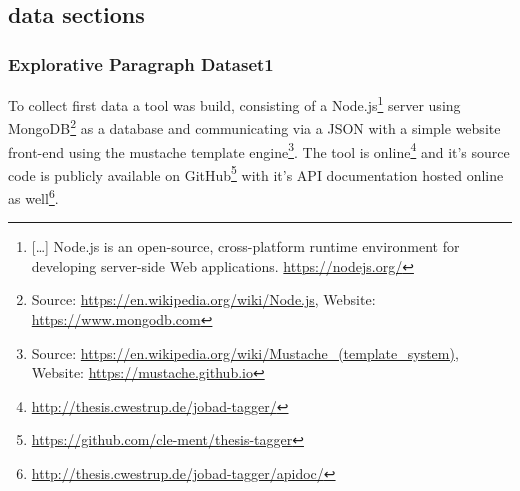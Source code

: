 \subsection{data sections}
\label{sub:data sections}

%
%
%
%


\subsubsection{Explorative Paragraph Dataset1}


To collect first data a tool was build, consisting of a Node.js\footnote{[\ldots] Node.js is an open-source, cross-platform runtime environment for developing server-side Web applications. \url{https://nodejs.org/}} server using MongoDB\footnote{ Source: \url{https://en.wikipedia.org/wiki/Node.js}, Website: \url{https://www.mongodb.com}} as a database and communicating via a JSON with a simple website front-end using the mustache template engine\footnote{ Source: \url{https://en.wikipedia.org/wiki/Mustache_(template_system)}, Website: \url{https://mustache.github.io}}.
The tool is online\footnote{\url{http://thesis.cwestrup.de/jobad-tagger/}} and it's source code is publicly available on GitHub\footnote{\url{https://github.com/cle-ment/thesis-tagger}} with it's API documentation hosted online as well\footnote{\url{http://thesis.cwestrup.de/jobad-tagger/apidoc/}}.

